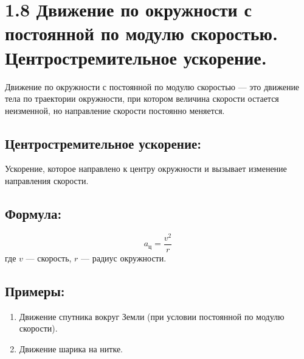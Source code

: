 \documentclass[a4paper,12pt]{article}
\begin{document}
\section*{1.8 Движение по окружности с постоянной по модулю скоростью. Центростремительное ускорение.}

\vspace{-9pt}
Движение по окружности с постоянной по модулю скоростью — это движение тела по траектории окружности, при котором величина скорости остается неизменной, но направление скорости постоянно меняется.
\vspace{-9pt}
\subsection*{Центростремительное ускорение:}
\vspace{-3pt}
Ускорение, которое направлено к центру окружности и вызывает изменение направления скорости.
\vspace{-9pt}
\subsection*{Формула:}
\vspace{-3pt}
$$a_ц = \frac{v^2}{r}$$ где $v$ — скорость, $r$ — радиус окружности.
\vspace{-9pt}
\subsection*{Примеры:}
\vspace{-3pt}
\begin{enumerate} [itemsep=0pt, topsep=0pt, parsep=3pt]
  \item Движение спутника вокруг Земли (при условии постоянной по модулю скорости).
  \item Движение шарика на нитке.
\end{enumerate}
\end{document}
